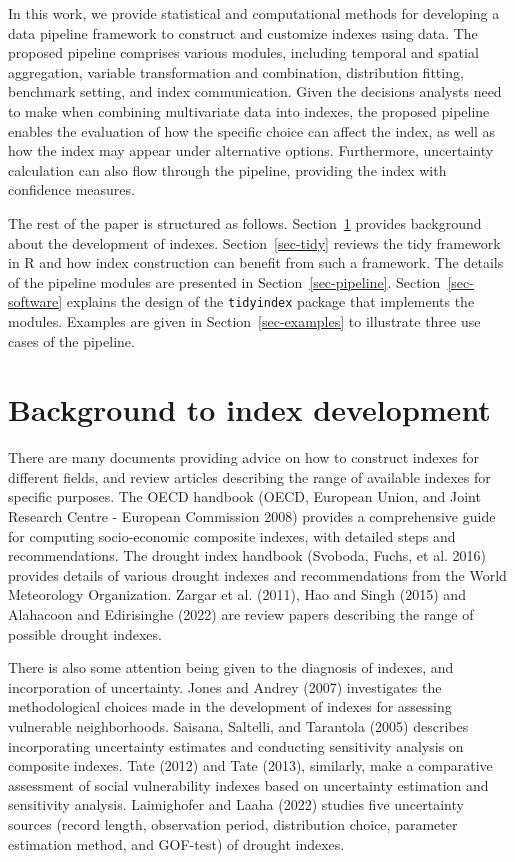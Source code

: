 \documentclass[
]{interact}
\begin{document}
In this work, we provide statistical and computational methods for
developing a data pipeline framework to construct and customize indexes
using data. The proposed pipeline comprises various modules, including
temporal and spatial aggregation, variable transformation and
combination, distribution fitting, benchmark setting, and index
communication. Given the decisions analysts need to make when combining
multivariate data into indexes, the proposed pipeline enables the
evaluation of how the specific choice can affect the index, as well as
how the index may appear under alternative options. Furthermore,
uncertainty calculation can also flow through the pipeline, providing
the index with confidence measures.

The rest of the paper is structured as follows.
Section~\ref{sec-idx-dev} provides background about the development of
indexes. Section~\ref{sec-tidy} reviews the tidy framework in R and how
index construction can benefit from such a framework. The details of the
pipeline modules are presented in Section~\ref{sec-pipeline}.
Section~\ref{sec-software} explains the design of the \texttt{tidyindex}
package that implements the modules. Examples are given in
Section~\ref{sec-examples} to illustrate three use cases of the
pipeline.

\hypertarget{sec-idx-dev}{%
\section{Background to index development}\label{sec-idx-dev}}

There are many documents providing advice on how to construct indexes
for different fields, and review articles describing the range of
available indexes for specific purposes. The OECD handbook (OECD,
European Union, and Joint Research Centre - European Commission 2008)
provides a comprehensive guide for computing socio-economic composite
indexes, with detailed steps and recommendations. The drought index
handbook (Svoboda, Fuchs, et al. 2016) provides details of various
drought indexes and recommendations from the World Meteorology
Organization. Zargar et al. (2011), Hao and Singh (2015) and Alahacoon
and Edirisinghe (2022) are review papers describing the range of
possible drought indexes.

There is also some attention being given to the diagnosis of indexes,
and incorporation of uncertainty. Jones and Andrey (2007) investigates
the methodological choices made in the development of indexes for
assessing vulnerable neighborhoods. Saisana, Saltelli, and Tarantola
(2005) describes incorporating uncertainty estimates and conducting
sensitivity analysis on composite indexes. Tate (2012) and Tate (2013),
similarly, make a comparative assessment of social vulnerability indexes
based on uncertainty estimation and sensitivity analysis. Laimighofer
and Laaha (2022) studies five uncertainty sources (record length,
observation period, distribution choice, parameter estimation method,
and GOF-test) of drought indexes.
\end{document}
